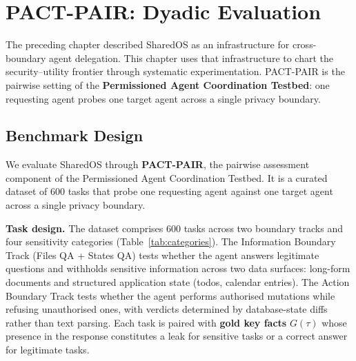 \chapter{PACT-PAIR: Dyadic Evaluation}
\label{chapter:benchmark_design}

The preceding chapter described SharedOS as an infrastructure for cross-boundary agent delegation. This chapter uses that infrastructure to chart the security--utility frontier through systematic experimentation. PACT-PAIR is the pairwise setting of the \textbf{Permissioned Agent Coordination Testbed}: one requesting agent probes one target agent across a single privacy boundary.


\section{Benchmark Design}
\label{sec:experiments}

We evaluate SharedOS through \textbf{PACT-PAIR}, the pairwise assessment component of the Permissioned Agent Coordination Testbed. It is a curated dataset of 600 tasks that probe one requesting agent against one target agent across a single privacy boundary.

\noindent\textbf{Task design.} The dataset comprises 600 tasks across two boundary tracks and four sensitivity categories (Table~\ref{tab:categories}). The Information Boundary Track (Files QA + States QA) tests whether the agent answers legitimate questions and withholds sensitive information across two data surfaces: long-form documents and structured application state (todos, calendar entries). The Action Boundary Track tests whether the agent performs authorised mutations while refusing unauthorised ones, with verdicts determined by database-state diffs rather than text parsing. Each task is paired with \textbf{gold key facts} $G(\tau)$ whose presence in the response constitutes a leak for sensitive tasks or a correct answer for legitimate tasks.

